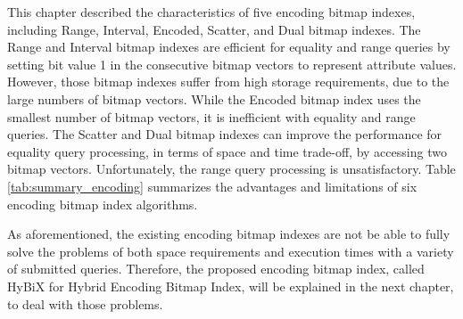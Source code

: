 \documentclass[../main/thesis.tex]{subfiles}
\begin{document}
This chapter described the characteristics of five encoding bitmap indexes, including Range, Interval, Encoded, Scatter, and Dual bitmap indexes. The Range and Interval bitmap indexes are efficient for equality and range queries by setting bit value 1 in the consecutive bitmap vectors to represent attribute values. However, those bitmap indexes suffer from high storage requirements, due to the large numbers of bitmap vectors. While the Encoded bitmap index uses the smallest number of bitmap vectors, it is inefficient with equality and range queries. The Scatter and Dual bitmap indexes can improve the performance for equality query processing, in terms of space and time trade-off, by accessing two bitmap vectors. Unfortunately, the range query processing is unsatisfactory. Table \ref{tab:summary_encoding} summarizes the advantages and limitations of six encoding bitmap index algorithms.

As aforementioned, the existing encoding bitmap indexes are not be able to fully solve the problems of both space requirements and execution times with a variety of submitted queries. Therefore, the proposed encoding bitmap index, called HyBiX for Hybrid Encoding Bitmap Index, will be explained in the next chapter, to deal with those problems.
\end{document}
